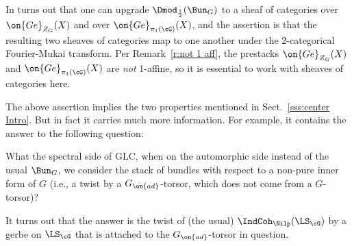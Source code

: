 \documentclass[9pt]{amsart}
\theoremstyle{remark}
\theoremstyle{definition}
\theoremstyle{remark}
\newcommand{\secref}[1]{Sect.~\ref{#1}}
\newcommand{\remref}[1]{Remark~\ref{#1}}
\numberwithin{equation}{section}
\begin{document}
\medskip

In turns out that one can upgrade $\Dmod_{\frac{1}{2}}(\Bun_G)$ to a sheaf of categories over $\on{Ge}_{Z_G}(X)$
and over $\on{Ge}_{\pi_1(\cG)}(X)$, and the assertion is that the resulting two sheaves of categories map to one
another under the 2-categorical Fourier-Mukai transform. 
Per \remref{r:not 1 aff}, the prestacks 
$\on{Ge}_{Z_G}(X)$ and $\on{Ge}_{\pi_1(\cG)}(X)$ are
\emph{not} 1-affine, so it is essential to work
with sheaves of categories here. 

\medskip

The above assertion implies the two properties mentioned in \secref{sss:center Intro}. But in fact it carries much
more information. For example, it contains the answer to the following question: 

\medskip

What the spectral side of GLC,
when on the automorphic side instead of the usual $\Bun_G$, we consider the stack of bundles with respect to
a non-pure inner form of $G$ (i.e., a twist by a $G_{\on{ad}}$-torsor, which does not come from a $G$-torsor)?

\medskip

It turns out that the answer is the twist of (the usual) $\IndCoh_\Nilp(\LS_\cG)$ by a gerbe on $\LS_\cG$ that is
attached to the $G_{\on{ad}}$-torsor in question. 
\end{document}
